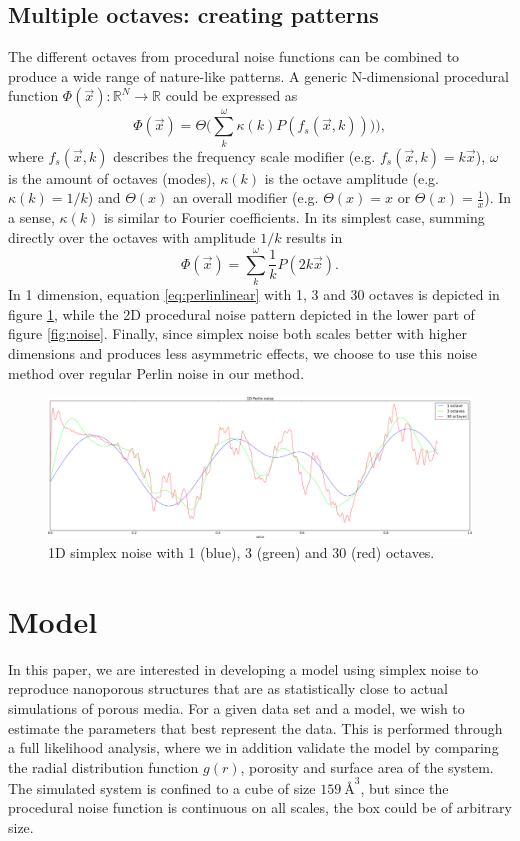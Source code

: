 \documentclass[aps,pre,twocolumn,letterpaper,floatfix,showpacs]{revtex4}
\begin{document}
\subsection{Multiple octaves: creating patterns}
\label{sec:octaves}
The different octaves from procedural noise functions can be combined
to produce a wide range of nature-like patterns. A generic
N-dimensional procedural function $\Phi(\vec x): \mathbb R^N \to
\mathbb R$ could be expressed as
\begin{equation}
\label{eq:procedural}
 \Phi(\vec x) = \Theta \Big(\sum_k^\omega \kappa (k) P(  f_s (\vec x,k) )) \Big),
 \end{equation}
where $f_s(\vec x,k)$ describes the frequency scale modifier (e.g. $f_s(\vec x,k) =
k\vec x$), $\omega$ is the amount of octaves (modes), $\kappa(k)$ is the octave amplitude (e.g. $\kappa(k) = 1/k$)
and $\Theta(x)$ an overall modifier (e.g. $\Theta(x) = x$ or
$\Theta(x) = \frac{1}{x}$). In a sense, $\kappa(k)$ is similar to Fourier coefficients. 
In its simplest case, summing directly over the octaves with amplitude $1/k$ results in 
\begin{equation}
\label{eq:perlinlinear}
 \Phi(\vec x) = \sum_k^\omega \frac{1}{k} P( 2k\vec x).
\end{equation}
In 1 dimension, equation \ref{eq:perlinlinear} with 1, 3 and 30 octaves is depicted in figure \ref{fig:1dperlin}, while the 2D procedural noise pattern depicted in the lower
part of figure \ref{fig:noise}. Finally, since simplex noise both scales better with higher dimensions and produces less asymmetric effects, we choose to use this noise method over regular Perlin noise in our method.  

\begin{figure}
\includegraphics[width=.5\textwidth]{1d_perlin.png}
\caption{1D simplex noise with 1 (blue), 3 (green) and 30 (red) octaves. }
\label{fig:1dperlin}
\end{figure}


\section{Model}
In this paper, we are interested in developing a model using simplex noise to reproduce nanoporous structures that are as statistically close to actual simulations of porous media. For a given data set and a model, we wish to estimate the parameters that best represent the data. This is performed through a full likelihood analysis, where we in addition validate the model by comparing the radial distribution function $g(r)$, porosity and surface area of the system. The simulated system is confined to a cube of size $\SI{159} {\angstrom}^3$, but since the procedural noise function is continuous on all scales, the box could be of arbitrary size. 
\end{document}
